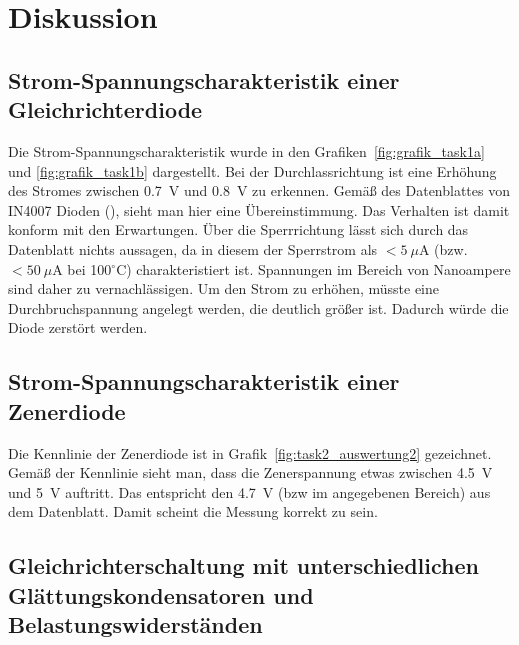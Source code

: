 \documentclass{article}
\begin{document}
\section{Diskussion}

\subsection{Strom-Spannungscharakteristik einer Gleichrichterdiode}

Die Strom-Spannungscharakteristik wurde in den Grafiken~\ref{fig:grafik_task1a} und \ref{fig:grafik_task1b} dargestellt. Bei der Durchlassrichtung ist eine Erhöhung des Stromes zwischen 0.7~V und 0.8~V zu erkennen. Gemäß des Datenblattes von IN4007 Dioden (\cite{conrad_diode1}), sieht man hier eine Übereinstimmung. Das Verhalten ist damit konform mit den Erwartungen. Über die Sperrrichtung lässt sich durch das Datenblatt nichts aussagen, da in diesem der Sperrstrom als $<5~\mu$A (bzw. $<50~\mu$A bei 100$^\circ$C) charakteristiert ist. Spannungen im Bereich von Nanoampere sind daher zu vernachlässigen. Um den Strom zu erhöhen, müsste eine Durchbruchspannung angelegt werden, die deutlich größer ist. Dadurch würde die Diode zerstört werden.



\subsection{Strom-Spannungscharakteristik einer Zenerdiode}

Die Kennlinie der Zenerdiode ist in Grafik~\ref{fig:task2_auswertung2} gezeichnet. Gemäß der Kennlinie sieht man, dass die Zenerspannung etwas zwischen 4.5~V und 5~V auftritt. Das entspricht den 4.7~V (bzw im angegebenen Bereich) aus dem Datenblatt. Damit scheint die Messung korrekt zu sein.

\subsection{Gleichrichterschaltung mit unterschiedlichen Glättungskondensatoren und Belastungswiderständen}
\end{document}
